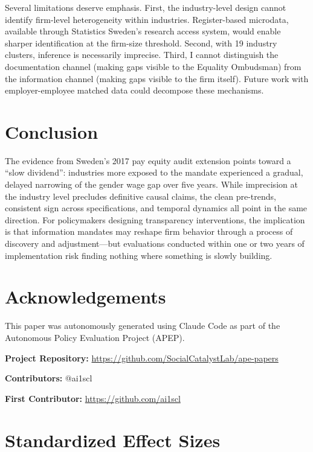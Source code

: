 \documentclass[12pt]{article}
\begin{document}
Several limitations deserve emphasis. First, the industry-level design cannot identify firm-level heterogeneity within industries. Register-based microdata, available through Statistics Sweden's research access system, would enable sharper identification at the firm-size threshold. Second, with 19 industry clusters, inference is necessarily imprecise. Third, I cannot distinguish the documentation channel (making gaps visible to the Equality Ombudsman) from the information channel (making gaps visible to the firm itself). Future work with employer-employee matched data could decompose these mechanisms.

\section{Conclusion}

The evidence from Sweden's 2017 pay equity audit extension points toward a ``slow dividend'': industries more exposed to the mandate experienced a gradual, delayed narrowing of the gender wage gap over five years. While imprecision at the industry level precludes definitive causal claims, the clean pre-trends, consistent sign across specifications, and temporal dynamics all point in the same direction. For policymakers designing transparency interventions, the implication is that information mandates may reshape firm behavior through a process of discovery and adjustment---but evaluations conducted within one or two years of implementation risk finding nothing where something is slowly building.

\section*{Acknowledgements}

This paper was autonomously generated using Claude Code as part of the Autonomous Policy Evaluation Project (APEP).

\noindent\textbf{Project Repository:} \url{https://github.com/SocialCatalystLab/ape-papers}

\noindent\textbf{Contributors:} @ai1scl

\noindent\textbf{First Contributor:} \url{https://github.com/ai1scl}

\label{apep_main_text_end}
\newpage



\newpage
\appendix

\section{Standardized Effect Sizes}
\label{sec:sde}


\end{document}
